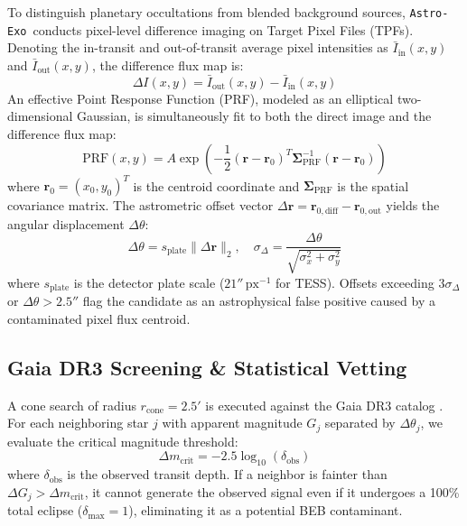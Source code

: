 \documentclass[twocolumn,trackchanges]{aastex631}
\newcommand{\astroexo}{\texttt{Astro-Exo}}
\begin{document}
To distinguish planetary occultations from blended background sources, \astroexo\ conducts pixel-level difference imaging on Target Pixel Files (TPFs). Denoting the in-transit and out-of-transit average pixel intensities as $\bar{I}_{\text{in}}(x, y)$ and $\bar{I}_{\text{out}}(x, y)$, the difference flux map is:
\begin{equation}
    \Delta I(x, y) = \bar{I}_{\text{out}}(x, y) - \bar{I}_{\text{in}}(x, y)
\end{equation}
An effective Point Response Function (PRF), modeled as an elliptical two-dimensional Gaussian, is simultaneously fit to both the direct image and the difference flux map:
\begin{equation}
    \mathrm{PRF}(x, y) = A \exp\left( -\frac{1}{2} (\mathbf{r} - \mathbf{r}_0)^T \boldsymbol{\Sigma}_{\text{PRF}}^{-1} (\mathbf{r} - \mathbf{r}_0) \right)
\end{equation}
where $\mathbf{r}_0 = (x_0, y_0)^T$ is the centroid coordinate and $\boldsymbol{\Sigma}_{\text{PRF}}$ is the spatial covariance matrix. The astrometric offset vector $\Delta \mathbf{r} = \mathbf{r}_{0, \text{diff}} - \mathbf{r}_{0, \text{out}}$ yields the angular displacement $\Delta \theta$:
\begin{equation}
    \Delta \theta = s_{\text{plate}} \|\Delta \mathbf{r}\|_2, \quad \sigma_{\Delta} = \frac{\Delta \theta}{\sqrt{\sigma_x^2 + \sigma_y^2}}
\end{equation}
where $s_{\text{plate}}$ is the detector plate scale ($21''\,\text{px}^{-1}$ for TESS). Offsets exceeding $3\sigma_{\Delta}$ or $\Delta \theta > 2.5''$ flag the candidate as an astrophysical false positive caused by a contaminated pixel flux centroid.

\subsection{Gaia DR3 Screening \& Statistical Vetting}
\label{subsec:gaia_vetting}

A cone search of radius $r_{\text{cone}} = 2.5'$ is executed against the Gaia DR3 catalog \citep{GaiaDR3_2023}. For each neighboring star $j$ with apparent magnitude $G_j$ separated by $\Delta \theta_j$, we evaluate the critical magnitude threshold:
\begin{equation}
    \Delta m_{\text{crit}} = -2.5 \log_{10}(\delta_{\text{obs}})
\end{equation}
where $\delta_{\text{obs}}$ is the observed transit depth. If a neighbor is fainter than $\Delta G_j > \Delta m_{\text{crit}}$, it cannot generate the observed signal even if it undergoes a 100\% total eclipse ($\delta_{\text{max}} = 1$), eliminating it as a potential BEB contaminant.
\end{document}
